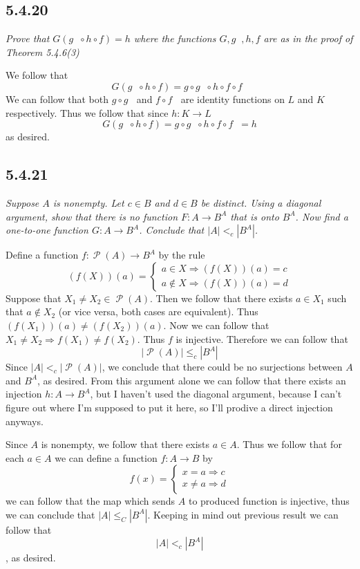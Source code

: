 \documentclass[11pt,oneside,titlepage]{book}
\DeclareMathOperator \pow {\mathcal {P}}
\DeclareMathOperator \inv {^{-1}}
\DeclareMathOperator \ra {\Rightarrow}
\begin{document}
\subsection*{5.4.20}

\textit{ Prove that $G(g\inv \circ h \circ f) = h$ where the functions $G, g\inv, h, f$ are
  as in the proof of Theorem 5.4.6(3) }

We follow that
$$G(g\inv \circ h \circ f) = g \circ g\inv \circ h \circ f \circ f\inv $$
We can follow that both $g \circ g\inv$ and $f \circ f\inv$ are identity functions on
$L$ and $K$ respectively. Thus we follow that since $h: K \to L$
$$G(g\inv \circ h \circ f) = g \circ g\inv \circ h \circ f \circ f\inv = h$$
as desired.

\subsection*{5.4.21}

\textit{Suppose $A$ is nonempty. Let $c \in B$ and $d \in B$ be distinct. Using a diagonal argument,
  show that there is no function $F: A \to B^A$ that is onto $B^A$. Now find a one-to-one
  function $G: A \to B^A$. Conclude that $|A| <_c |B^A|$.}

Define a function $f: \pow(A) \to B^A$ by the rule
$$(f(X))(a) =
\begin{cases}
  a \in X \ra (f(X))(a) = c \\
  a \notin X \ra (f(X))(a) = d
\end{cases}
$$
Suppose that $X_1 \neq X_2 \in \pow(A)$. Then we follow that there exists $a \in X_1$ such that
$a \notin X_2$ (or vice versa, both cases are equivalent).
Thus $(f(X_1))(a) \neq (f(X_2))(a)$. Now we can follow that $X_1 \neq X_2 \ra f(X_1) \neq f(X_2)$.
Thus $f$ is injective. Therefore we can follow that
$$|\pow(A)| \leq_c |B^A|$$
Since $|A| <_c |\pow(A)|$, we conclude that there could be no surjections between $A$ and $B^A$,
as desired. From this argument alone we can follow that there exists an injection
$h: A \to B^A$, but I haven't used the diagonal argument, because I can't figure out where
I'm supposed to put it here, so I'll prodive a direct injection anyways.

Since $A$ is nonempty, we follow that there exists $a \in A$. Thus we follow that
for each $a \in A$ we can define a function $f: A \to B$ by
$$f(x) =
\begin{cases}
  x = a \ra c\\
  x \neq a \ra d
\end{cases}
$$
we can follow that the map which sends $A$ to produced function is injective, thus we
can conclude that $|A| \leq_C |B^A|$. Keeping in mind out previous result we can follow that
$$|A| <_c |B^A|$$, as desired.
\end{document}
